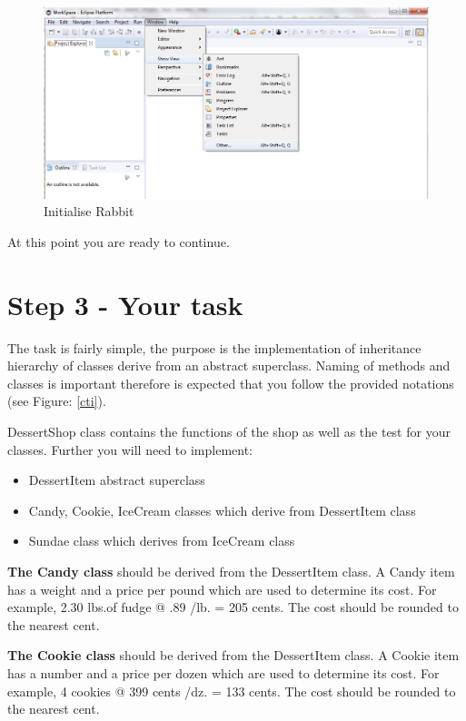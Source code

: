 \begin{figure}[!ht]
		\begin{center}		 	
			\includegraphics[width=\textwidth]{figures/ws1.png}
		\end{center}
		\caption{Initialise Rabbit}
		\label{fig:ir1}
	\end{figure}

At this point you are ready to continue.

\section{Step 3 - Your task}
The task is fairly simple, the purpose is the implementation of inheritance hierarchy of classes derive from an abstract superclass. Naming of methods and classes is important therefore is expected that you follow the provided notations (see Figure: \ref{cti}).

DessertShop class contains the functions of the shop as well as the test for your classes. Further you will need to implement:
\begin{itemize}
	\item DessertItem abstract superclass
	\item Candy, Cookie, IceCream classes which derive from DessertItem class
	\item Sundae class which derives from IceCream class
\end{itemize}

\textbf{The Candy class} should be derived from the DessertItem class. A Candy item has a weight and a price per pound which are used to determine its cost. For example, 2.30 lbs.of fudge @ .89 /lb. = 205 cents. The cost should be rounded to the nearest cent.

\textbf{The Cookie class} should be derived from the DessertItem class. A Cookie item has a number and a price per dozen which are used to determine its cost. For example, 4 cookies @ 399 cents /dz. = 133 cents. The cost should be rounded to the nearest cent.

